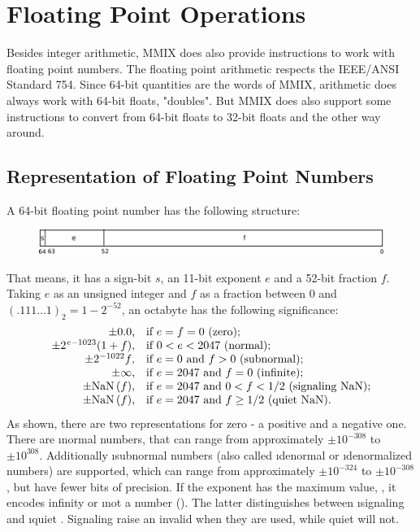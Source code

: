 \section{Floating Point Operations}

Besides integer arithmetic, MMIX does also provide instructions to work with floating point numbers. The floating point arithmetic respects the IEEE/ANSI Standard 754. Since 64-bit quantities are the words of MMIX, arithmetic does always work with 64-bit floats, \ie "doubles". But MMIX does also support some instructions to convert from 64-bit floats to 32-bit floats and the other way around.

\subsection{Representation of Floating Point Numbers}

A 64-bit floating point number has the following structure:
\begin{figure}[H]
	\centering
	\includegraphics[width=\textwidth]{img/float-crop.pdf}
\end{figure}
\vspace{-20pt}
\noindent That means, it has a sign-bit $s$, an 11-bit exponent $e$ and a 52-bit fraction $f$. Taking $e$ as an unsigned integer and $f$ as a fraction between 0 and $(.111\dots1)_2 = 1 - 2^{-52}$, an octabyte has the following significance:
$$\vbox{\halign{\hfil$\pm#$,\quad if &#\hfil\cr
	0.0								& $e = f = 0$ (zero);\cr
	2^{\mkern1mu e - 1023}(1 + f)	& $0 < e < 2047$ (normal);\cr
	2^{-1022}f						& $e = 0$ and $f > 0$ (subnormal);\cr
	\infty							& $e = 2047$ and $f = 0$ (infinite);\cr
	\NaN(f)							& $e = 2047$ and $0 < f < 1/2$ (signaling NaN);\cr
	\NaN(f)							& $e = 2047$ and $f \ge 1/2$ (quiet NaN).\cr
}}$$
As shown, there are two representations for zero - a positive and a negative one. There are \i{normal} numbers, that can range from approximately $\pm 10^{-308}$ to $\pm 10^{308}$. Additionally \i{subnormal} numbers (also called \i{denormal} or \i{denormalized} numbers) are supported, which can range from approximately $\pm 10^{-324}$ to $\pm 10^{-308}$, but have fewer bits of precision. If the exponent has the maximum value, , it encodes infinity or \i{not a number} (\NaN). The latter distinguishes between \i{signaling} and \i{quiet} \NaN. Signaling \NaNs raise an invalid  when they are used, while quiet \NaNs will not. \citep[pg. 15]{mmix-doc}

